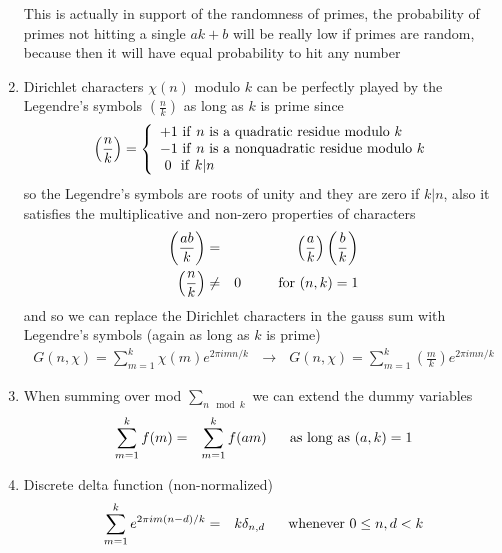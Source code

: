\documentclass[aps,preprint,preprintnumbers,nofootinbib,showpacs,prd]{revtex4-1}
\newcommand{\nbea}{\begin{eqnarray*}}
\newcommand{\neea}{\end{eqnarray*}}
\begin{document}
\begin{enumerate}
This is actually in support of the randomness of primes, the probability of primes not hitting a single $ak + b$ will be really low if primes are random, because then it will have equal probability to hit any number

\item Dirichlet characters $\chi(n)$ modulo $k$ can be perfectly played by the Legendre's symbols $\left( \frac{n}{k} \right)$ as long as $k$ is prime since
%
\nbea
\left(\frac{n}{k}\right) = \left \{
\begin{array}{l}
+1 ~{\rm if} ~ n ~{\rm is~a~quadratic~residue~modulo~} k \\
-1 ~{\rm if} ~ n ~{\rm is~a~non quadratic~residue~modulo~} k \\
~0 ~~{\rm if} ~ k|n
\end{array}
\right.
\neea
%
so the Legendre's symbols are roots of unity and they are zero if $k|n$, also it satisfies the multiplicative and non-zero properties of characters
%
\nbea
\left ( \frac{ab}{k} \right) & = & \left ( \frac{a}{k} \right) \left ( \frac{b}{k} \right) \\
\left ( \frac{n}{k} \right) & \neq & 0 ~~~~~~~~{\rm for}~ (n,k) = 1
\neea
%
and so we can replace the Dirichlet characters in the gauss sum with Legendre's symbols (again as long as $k$ is prime)
%
\nbea
G(n, \chi) = \sum_{m = 1}^k \chi(m) e^{2\pi i mn/k} ~~~ \longrightarrow ~~~ G(n, \chi) = \sum_{m = 1}^k \left(\frac{m}{k}\right) e^{2\pi i mn/k}
\neea
%

\item When summing over mod $\sum_{n \mod k}$ we can extend the dummy variables
%
\nbea
\sum_{m=1}^k f(m) & = & \sum_{m=1}^k f(am) ~~~~~ {\rm as~long~as}~ (a,k) = 1
\neea
%

\item Discrete delta function (non-normalized)
%
\nbea
\sum_{m=1}^k e^{2\pi i m(n-d)/k} & = & k\delta_{n,d} ~~~~~{\rm whenever~} 0 \le n,d < k
\neea
%


\end{enumerate}
\end{document}
